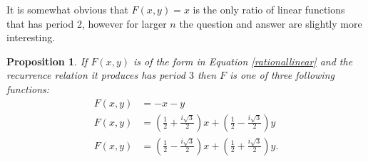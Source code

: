 \documentclass[12pt]{article}
\newtheorem{proposition}{Proposition}
\begin{document}
It is somewhat obvious that $F(x,y)=x$ is the only ratio of linear functions that has period 2, however for larger $n$ the question and answer are slightly more interesting. 
\begin{proposition} 
If $F(x,y)$ is of the form in Equation \ref{rationallinear} and the recurrence relation it produces has period $3$ then $F$ is one of three following functions:
\begin{align*}
F(x,y) &= -x-y \\
F(x,y) &= \left( \frac{1}{2} +\frac{i\sqrt{3}}{2} \right) x + \left( \frac{1}{2} -\frac{i\sqrt{3}}{2} \right) y \\
F(x,y) &= \left( \frac{1}{2} -\frac{i\sqrt{3}}{2} \right) x + \left( \frac{1}{2} +\frac{i\sqrt{3}}{2} \right) y.
\end{align*}
\end{proposition}
\end{document}
